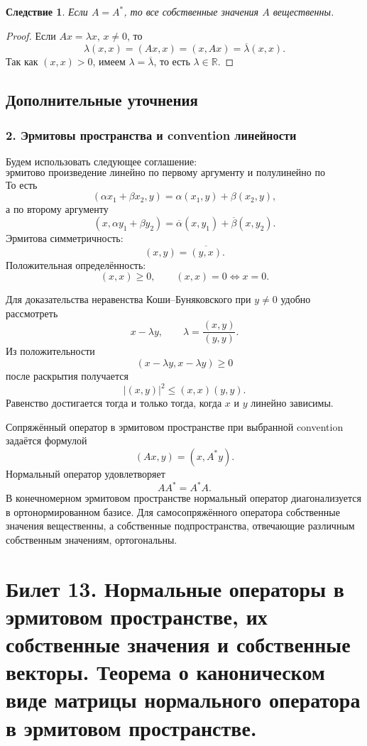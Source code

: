 \documentclass[12pt,a4paper]{article}
\theoremstyle{definition}
\theoremstyle{plain}
\newtheorem{corollary}[definition]{Следствие}
\theoremstyle{remark}
\newcommand{\R}{\mathbb{R}}
\begin{document}
\begin{corollary}
Если $A=A^*$, то все собственные значения $A$ вещественны.
\end{corollary}

\begin{proof}
Если $Ax=\lambda x$, $x\ne0$, то
\[
    \lambda(x,x)=(Ax,x)=(x,Ax)=\overline{\lambda}(x,x).
\]
Так как $(x,x)>0$, имеем $\lambda=\overline\lambda$, то есть $\lambda\in\R$.
\end{proof}

\subsection*{Дополнительные уточнения}

\subsubsection*{2. Эрмитовы пространства и convention линейности}
Будем использовать следующее соглашение:
\[
    \text{эрмитово произведение линейно по первому аргументу и полулинейно по второму.}
\]
То есть
\[
    (\alpha x_1+\beta x_2,y)=\alpha(x_1,y)+\beta(x_2,y),
\]
а по второму аргументу
\[
    (x,\alpha y_1+\beta y_2)=\overline{\alpha}(x,y_1)+\overline{\beta}(x,y_2).
\]
Эрмитова симметричность:
\[
    (x,y)=\overline{(y,x)}.
\]
Положительная определённость:
\[
    (x,x)\ge 0,
    \qquad
    (x,x)=0\Longleftrightarrow x=0.
\]

Для доказательства неравенства Коши--Буняковского при $y\ne0$ удобно рассмотреть
\[
    x-\lambda y,
    \qquad
    \lambda=\frac{(x,y)}{(y,y)}.
\]
Из положительности
\[
    (x-\lambda y,x-\lambda y)\ge0
\]
после раскрытия получается
\[
    |(x,y)|^2\le (x,x)(y,y).
\]
Равенство достигается тогда и только тогда, когда $x$ и $y$ линейно зависимы.

Сопряжённый оператор в эрмитовом пространстве при выбранной convention задаётся формулой
\[
    (Ax,y)=(x,A^*y).
\]
Нормальный оператор удовлетворяет
\[
    AA^*=A^*A.
\]
В конечномерном эрмитовом пространстве нормальный оператор диагонализуется в ортонормированном базисе.
Для самосопряжённого оператора собственные значения вещественны, а собственные подпространства, отвечающие различным собственным значениям, ортогональны.

\clearpage

\section{Билет 13. Нормальные операторы в эрмитовом пространстве, их собственные значения и собственные векторы. Теорема о каноническом виде матрицы нормального оператора в эрмитовом пространстве.}
\end{document}
